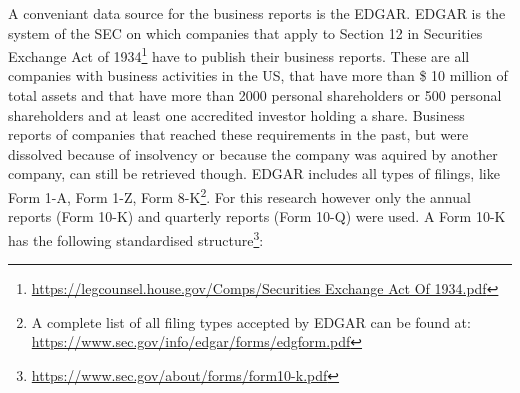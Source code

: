 A conveniant data source for the business reports is the \ac{EDGAR}.
\ac{EDGAR} is the system of the \ac{SEC} on which companies that apply to Section 12 in Securities Exchange Act of 1934\footnote{\url{https://legcounsel.house.gov/Comps/Securities Exchange Act Of 1934.pdf}} have to publish their business reports.
These are all companies with business activities in the US, that have more than \$ 10 million of total assets and that have more than 2000 personal shareholders or 500 personal shareholders and at least one accredited investor holding a share.
Business reports of companies that reached these requirements in the past, but were dissolved because of insolvency or because the company was aquired by another company, can still be retrieved though.
\ac{EDGAR} includes all types of filings, like Form 1-A, Form 1-Z, Form 8-K\footnote{A complete list of all filing types accepted by \ac{EDGAR} can be found at: \url{https://www.sec.gov/info/edgar/forms/edgform.pdf}}.
For this research however only the annual reports (Form 10-K) and quarterly reports (Form 10-Q) were used.
A Form 10-K has the following standardised structure\footnote{\url{https://www.sec.gov/about/forms/form10-k.pdf}}:
